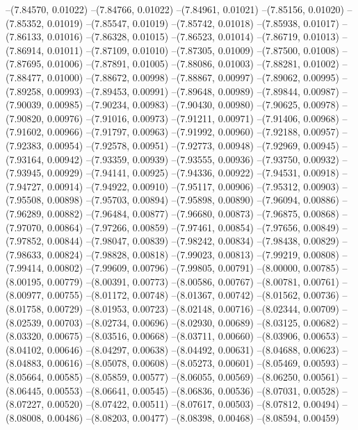 --(7.84570, 0.01022)
--(7.84766, 0.01022)
--(7.84961, 0.01021)
--(7.85156, 0.01020)
--(7.85352, 0.01019)
--(7.85547, 0.01019)
--(7.85742, 0.01018)
--(7.85938, 0.01017)
--(7.86133, 0.01016)
--(7.86328, 0.01015)
--(7.86523, 0.01014)
--(7.86719, 0.01013)
--(7.86914, 0.01011)
--(7.87109, 0.01010)
--(7.87305, 0.01009)
--(7.87500, 0.01008)
--(7.87695, 0.01006)
--(7.87891, 0.01005)
--(7.88086, 0.01003)
--(7.88281, 0.01002)
--(7.88477, 0.01000)
--(7.88672, 0.00998)
--(7.88867, 0.00997)
--(7.89062, 0.00995)
--(7.89258, 0.00993)
--(7.89453, 0.00991)
--(7.89648, 0.00989)
--(7.89844, 0.00987)
--(7.90039, 0.00985)
--(7.90234, 0.00983)
--(7.90430, 0.00980)
--(7.90625, 0.00978)
--(7.90820, 0.00976)
--(7.91016, 0.00973)
--(7.91211, 0.00971)
--(7.91406, 0.00968)
--(7.91602, 0.00966)
--(7.91797, 0.00963)
--(7.91992, 0.00960)
--(7.92188, 0.00957)
--(7.92383, 0.00954)
--(7.92578, 0.00951)
--(7.92773, 0.00948)
--(7.92969, 0.00945)
--(7.93164, 0.00942)
--(7.93359, 0.00939)
--(7.93555, 0.00936)
--(7.93750, 0.00932)
--(7.93945, 0.00929)
--(7.94141, 0.00925)
--(7.94336, 0.00922)
--(7.94531, 0.00918)
--(7.94727, 0.00914)
--(7.94922, 0.00910)
--(7.95117, 0.00906)
--(7.95312, 0.00903)
--(7.95508, 0.00898)
--(7.95703, 0.00894)
--(7.95898, 0.00890)
--(7.96094, 0.00886)
--(7.96289, 0.00882)
--(7.96484, 0.00877)
--(7.96680, 0.00873)
--(7.96875, 0.00868)
--(7.97070, 0.00864)
--(7.97266, 0.00859)
--(7.97461, 0.00854)
--(7.97656, 0.00849)
--(7.97852, 0.00844)
--(7.98047, 0.00839)
--(7.98242, 0.00834)
--(7.98438, 0.00829)
--(7.98633, 0.00824)
--(7.98828, 0.00818)
--(7.99023, 0.00813)
--(7.99219, 0.00808)
--(7.99414, 0.00802)
--(7.99609, 0.00796)
--(7.99805, 0.00791)
--(8.00000, 0.00785)
--(8.00195, 0.00779)
--(8.00391, 0.00773)
--(8.00586, 0.00767)
--(8.00781, 0.00761)
--(8.00977, 0.00755)
--(8.01172, 0.00748)
--(8.01367, 0.00742)
--(8.01562, 0.00736)
--(8.01758, 0.00729)
--(8.01953, 0.00723)
--(8.02148, 0.00716)
--(8.02344, 0.00709)
--(8.02539, 0.00703)
--(8.02734, 0.00696)
--(8.02930, 0.00689)
--(8.03125, 0.00682)
--(8.03320, 0.00675)
--(8.03516, 0.00668)
--(8.03711, 0.00660)
--(8.03906, 0.00653)
--(8.04102, 0.00646)
--(8.04297, 0.00638)
--(8.04492, 0.00631)
--(8.04688, 0.00623)
--(8.04883, 0.00616)
--(8.05078, 0.00608)
--(8.05273, 0.00601)
--(8.05469, 0.00593)
--(8.05664, 0.00585)
--(8.05859, 0.00577)
--(8.06055, 0.00569)
--(8.06250, 0.00561)
--(8.06445, 0.00553)
--(8.06641, 0.00545)
--(8.06836, 0.00536)
--(8.07031, 0.00528)
--(8.07227, 0.00520)
--(8.07422, 0.00511)
--(8.07617, 0.00503)
--(8.07812, 0.00494)
--(8.08008, 0.00486)
--(8.08203, 0.00477)
--(8.08398, 0.00468)
--(8.08594, 0.00459)
